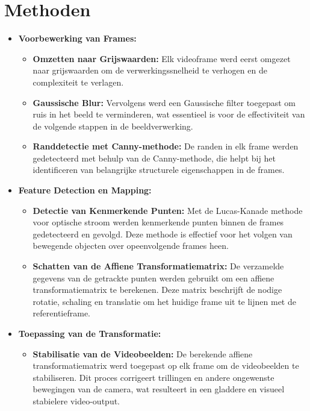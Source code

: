 \section{Methoden}
\begin{itemize}
  \item \textbf{Voorbewerking van Frames:}
  \begin{itemize}
    \item \textbf{Omzetten naar Grijswaarden:} Elk videoframe werd eerst omgezet naar grijswaarden om de verwerkingssnelheid te verhogen en de complexiteit te verlagen.
    \item \textbf{Gaussische Blur:} Vervolgens werd een Gaussische filter toegepast om ruis in het beeld te verminderen, wat essentieel is voor de effectiviteit van de volgende stappen in de beeldverwerking.
    \item \textbf{Randdetectie met Canny-methode:} De randen in elk frame werden gedetecteerd met behulp van de Canny-methode, die helpt bij het identificeren van belangrijke structurele eigenschappen in de frames.
  \end{itemize}
  \item \textbf{Feature Detection en Mapping:}
  \begin{itemize}
    \item \textbf{Detectie van Kenmerkende Punten:} Met de Lucas-Kanade methode voor optische stroom werden kenmerkende punten binnen de frames gedetecteerd en gevolgd. Deze methode is effectief voor het volgen van bewegende objecten over opeenvolgende frames heen.
    \item \textbf{Schatten van de Affiene Transformatiematrix:} De verzamelde gegevens van de getrackte punten werden gebruikt om een affiene transformatiematrix te berekenen. Deze matrix beschrijft de nodige rotatie, schaling en translatie om het huidige frame uit te lijnen met de referentieframe.
  \end{itemize}
  \item \textbf{Toepassing van de Transformatie:}
  \begin{itemize}
    \item \textbf{Stabilisatie van de Videobeelden:} De berekende affiene transformatiematrix werd toegepast op elk frame om de videobeelden te stabiliseren. Dit proces corrigeert trillingen en andere ongewenste bewegingen van de camera, wat resulteert in een gladdere en visueel stabielere video-output.
  \end{itemize}
\end{itemize}

